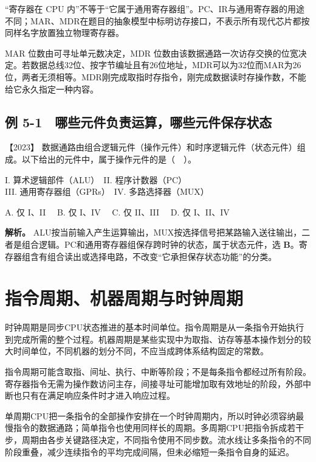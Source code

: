 ``寄存器在 CPU 内''不等于``它属于通用寄存器组''。PC、IR与通用寄存器的用途不同；MAR、MDR在题目的抽象模型中标明访存接口，不表示所有现代芯片都按同样名字放置独立物理寄存器。

MAR 位数由可寻址单元数决定，MDR 位数由该数据通路一次访存交换的位宽决定。若数据总线32位、按字节编址且有26位地址，MDR可以为32位而MAR为26位，两者无须相等。MDR刚完成取指时存指令，刚完成数据读时存操作数，不能给它永久指定一种内容。

\subsection{例 5-1　哪些元件负责运算，哪些元件保存状态}\label{co-ex5-1}

\noindent{}【2023】 数据通路由组合逻辑元件（操作元件）和时序逻辑元件（状态元件）组成。以下给出的元件中，属于操作元件的是（　）。

I. 算术逻辑部件（ALU）　II. 程序计数器（PC）\\
III. 通用寄存器组（GPRs）　IV. 多路选择器（MUX）

A. 仅 I、II　 B. 仅 I、IV　 C. 仅 II、III　 D. 仅 I、II、IV


\textbf{解析。} ALU按当前输入产生运算输出，MUX按选择信号把某路输入送往输出，二者是组合逻辑。PC和通用寄存器组保存跨时钟的状态，属于状态元件，选 \textbf{B}。寄存器组含有组合读出或选择电路，不改变``它承担保存状态功能''的分类。

\section{指令周期、机器周期与时钟周期}\label{co-05-02}

时钟周期是同步CPU状态推进的基本时间单位。指令周期是从一条指令开始执行到完成所需的整个过程。机器周期是某些实现中为取指、访存等基本操作划分的较大时间单位，不同机器的划分不同，不应当成跨体系结构固定的常数。

指令周期可能含取指、间址、执行、中断等阶段；不是每条指令都经过所有阶段。寄存器指令无需为操作数访问主存，间接寻址可能增加取有效地址的阶段，外部中断也只有在满足响应条件时才进入响应过程。

单周期CPU把一条指令的全部操作安排在一个时钟周期内，所以时钟必须容纳最慢指令的数据通路；简单指令也使用同样长的周期。多周期CPU把指令拆成若干步，周期由各步关键路径决定，不同指令使用不同步数。流水线让多条指令的不同阶段重叠，减少连续指令的平均完成间隔，但未必缩短一条指令自身的延迟。

